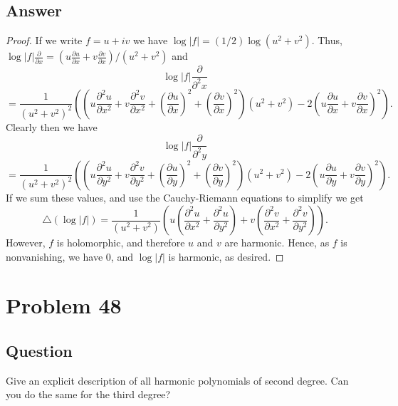 \documentclass[11pt]{article}
\begin{document}
\subsection{Answer}
\begin{proof}If we write $f = u + i v$ we have $\log |f| = (1/2) \log(u^2 + v^2)$. Thus, $\log |f| \frac{\partial}{\partial x} = (u \frac{\partial u }{\partial x} + v \frac{\partial v}{ \partial x} )/ (u^2 + v^2)$ and 
\[\log|f| \frac{\partial}{\partial^2 x} \]
\[= \frac{1}{\left(u^2 + v^2\right)^2} \left( \left( u \frac{\partial^2 u }{ \partial x^2}+ v \frac{\partial^2 v}{\partial x^2} + \left(\frac{\partial u }{\partial x}\right)^2  + \left(\frac{\partial v }{\partial x}\right)^2\right)\left(u^2+ v^2 \right) - 2 \left( u \frac{\partial u }{ \partial x} + v \frac{\partial v }{ \partial x}\right)^2 \right).\]
Clearly then we have 
\[\log|f| \frac{\partial}{\partial^2 y} \]
\[= \frac{1}{\left(u^2 + v^2\right)^2} \left( \left( u \frac{\partial^2 u }{ \partial y^2}+ v \frac{\partial^2 v}{\partial y^2} + \left(\frac{\partial u }{\partial y}\right)^2  + \left(\frac{\partial v }{\partial y}\right)^2\right)\left(u^2+ v^2 \right) - 2 \left( u \frac{\partial u }{ \partial y} + v \frac{\partial v }{ \partial y}\right)^2 \right).\]
If we sum these values, and use the Cauchy-Riemann equations to simplify we get
\[\triangle (\log|f|) = \frac{1}{\left(u^2 + v^2\right)} \left( u  \left( \frac{\partial^2 u }{\partial x^2} + \frac{\partial ^2 u }{\partial y^2}\right) + v\left(\frac{\partial^2 v }{\partial x^2 }+ \frac{\partial^2 v }{ \partial y^2} \right) \right).\]
However, $f$ is holomorphic, and therefore $u$ and $v$ are harmonic. Hence, as $f$ is nonvanishing, we have 0, and $\log|f|$ is harmonic, as desired. 
\end{proof}
\section{Problem  48}
\subsection{Question}
Give an explicit description of all harmonic polynomials of second degree. Can you do the same for the third degree?
\end{document}
